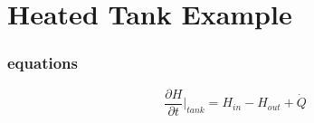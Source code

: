 \documentclass[11pt]{article}
\begin{document}
\part{Heated Tank Example}

\section{equations}
$$\frac{\partial H}{\partial t} |_{tank}  = H_{in}-H_{out} + \dot{Q}$$
\end{document}
